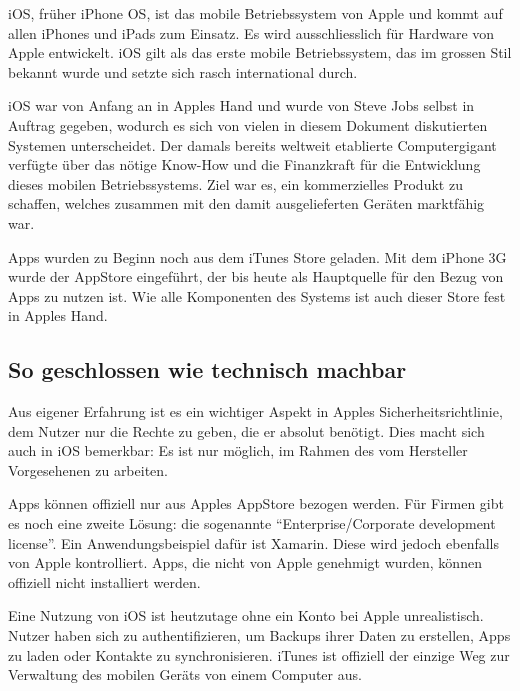 iOS, früher iPhone OS, ist das mobile Betriebssystem von Apple und kommt auf allen iPhones und iPads zum Einsatz. Es wird ausschliesslich für Hardware von Apple entwickelt\thinspace\cite{online:ios-wikipedia}. iOS gilt als das erste mobile Betriebssystem, das im grossen Stil bekannt wurde und setzte sich rasch international durch.

iOS war von Anfang an in Apples Hand und wurde von Steve Jobs selbst in Auftrag gegeben, wodurch es sich von vielen in diesem Dokument diskutierten Systemen unterscheidet\thinspace\cite{online:ios-wikipedia}. Der damals bereits weltweit etablierte Computergigant verfügte über das nötige \mbox{Know-How} und die Finanzkraft für die Entwicklung dieses mobilen Betriebssystems. Ziel war es, ein kommerzielles Produkt zu schaffen, welches zusammen mit den damit ausgelieferten Geräten marktfähig war.

Apps wurden zu Beginn noch aus dem iTunes Store geladen\thinspace\cite{online:ios-appstore}. Mit dem iPhone 3G wurde der AppStore eingeführt, der bis heute als Hauptquelle für den Bezug von Apps zu nutzen ist. Wie alle Komponenten des Systems ist auch dieser Store fest in Apples Hand.
\newline

\subsection{So geschlossen wie technisch machbar}
Aus eigener Erfahrung ist es ein wichtiger Aspekt in Apples Sicherheitsrichtlinie, dem Nutzer nur die Rechte zu geben, die er absolut benötigt. Dies macht sich auch in iOS bemerkbar: Es ist nur möglich, im Rahmen des vom Hersteller Vorgesehenen zu arbeiten.

Apps können offiziell nur aus Apples AppStore bezogen werden. Für Firmen gibt es noch eine zweite Lösung: die sogenannte ``Enterprise/Corporate development license''. Ein Anwendungsbeispiel dafür ist Xamarin\thinspace\cite{online:ios-xamarin}. Diese wird jedoch ebenfalls von Apple kontrolliert\thinspace\cite{online:ios-appsfromoutside}. Apps, die nicht von Apple genehmigt wurden, können offiziell nicht installiert werden\thinspace\cite{online:ios-appstore}.

Eine Nutzung von iOS ist heutzutage ohne ein Konto bei Apple unrealistisch. Nutzer haben sich zu authentifizieren, um Backups ihrer Daten zu erstellen, Apps zu laden oder Kontakte zu synchronisieren. iTunes ist offiziell der einzige Weg zur Verwaltung des mobilen Geräts von einem Computer aus.

